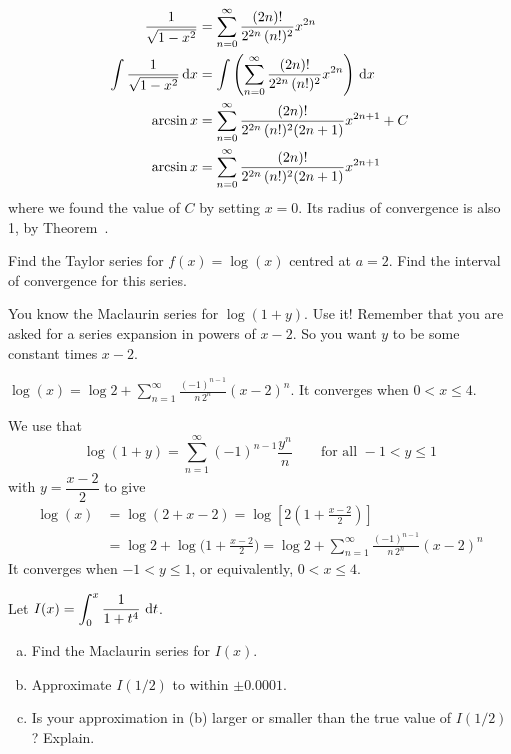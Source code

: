 \begin{solution}
\begin{enumerate}[(a)]
\begin{align*}
\frac{1}{\sqrt{1-x^2}}&=\sum_{n=0}^\infty\frac{(2n)!}{2^{2n}\,(n!)^2}x^{2n}\\
\int\frac{1}{\sqrt{1-x^2}}\,\mathrm{d}x&=\int\left(\sum_{n=0}^\infty\frac{(2n)!}{2^{2n}\,(n!)^2}x^{2n}\right)\,\mathrm{d}x\\
\arcsin x &=\sum_{n=0}^\infty\frac{(2n)!}{2^{2n}\,(n!)^2(2n+1)}x^{2n+1}+C\\
\arcsin x &=\sum_{n=0}^\infty\frac{(2n)!}{2^{2n}\,(n!)^2(2n+1)}x^{2n+1}
\end{align*}
where we found the value of $C$ by setting $x=0$. Its radius of convergence is also 1, by Theorem~.
\end{enumerate}
\end{solution}


\begin{question}[2014A]
Find the Taylor series for $f(x) = \log(x)$ centred at $a = 2$.
Find the interval of convergence for this series.
\end{question}

\begin{hint}
You know the Maclaurin series for $\log(1+y)$. Use it!
Remember that you are asked for a series expansion in powers
of $x-2$. So you want $y$ to be some constant times $x-2$.
\end{hint}

\begin{answer}
$\log(x) =\displaystyle \log 2 +\sum\limits_{n=1}^\infty \frac{(-1)^{n-1}}{n\,2^n}(x-2)^n$.
It converges when $0<x\le 4$.
\end{answer}

\begin{solution}
We use that
\begin{equation*}
\log(1+y)= \sum_{n=1}^\infty (-1)^{n-1} \frac{y^n}{n} \qquad
\text{for all } -1 < y \le 1
\end{equation*}
with $y=\dfrac{x-2}{2}$ to give
\begin{align*}
\log(x) & = \log(2 +x -2)
=\log\left[2\left(1+\frac{x-2}{2}\right)\right]\\
        &= \log 2 +\log\Big(1+\frac{x-2}{2}\Big)
         =\log 2 +\sum_{n=1}^\infty \frac{(-1)^{n-1}}{n\,2^n}(x-2)^n
\end{align*}
It converges when $-1<y\le 1$, or equivalently,
$0<x\le 4$.
\end{solution}

\begin{question}[1996A]
Let $\displaystyle I(x)=\int_0^x\frac{1}{1+t^4}\ \mathrm{d}t$.
\begin{enumerate}[(a)]
\item
Find the Maclaurin series for $I(x)$.
\item
Approximate $I(1/2)$ to within $\pm0.0001$.
\item
Is your approximation in (b) larger or smaller than the true value of $I(1/2)$? Explain.
\end{enumerate}
\end{question}

